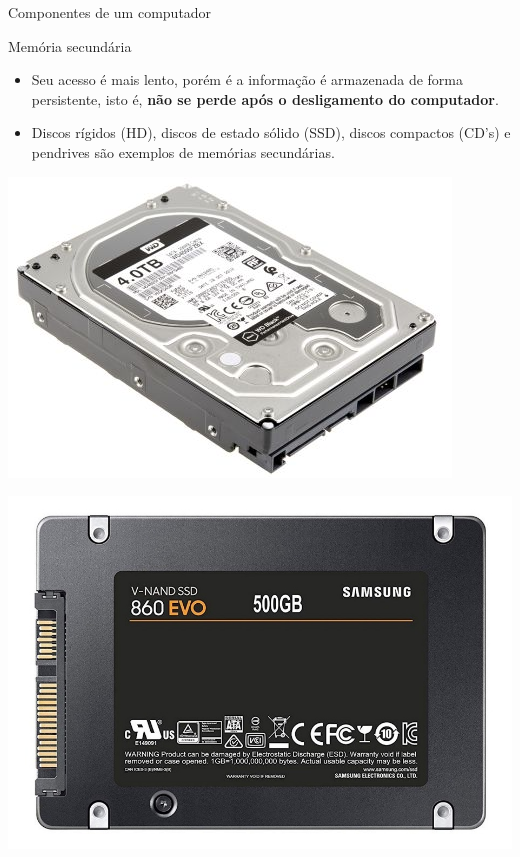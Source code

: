 \begin{frame}{Componentes de um computador}
	\begin{block}{Memória secundária}
		\begin{itemize}
			\item Seu acesso é mais lento, porém é a informação é armazenada de forma persistente, isto é, \textbf{não se perde após o desligamento do computador}.
			\item Discos rígidos (HD), discos de estado sólido (SSD), discos compactos (CD's) e pendrives são exemplos de memórias secundárias.
		\end{itemize}
	\end{block}

	\begin{minipage}{0.49\linewidth}
		\centering
		\includegraphics[width=1\linewidth]{Figuras/Ch01/fig34}
	\end{minipage}\hfill
	\begin{minipage}{0.49\linewidth}
		\centering
		\includegraphics[width=1\linewidth]{Figuras/Ch01/fig33}
	\end{minipage}

\end{frame}


